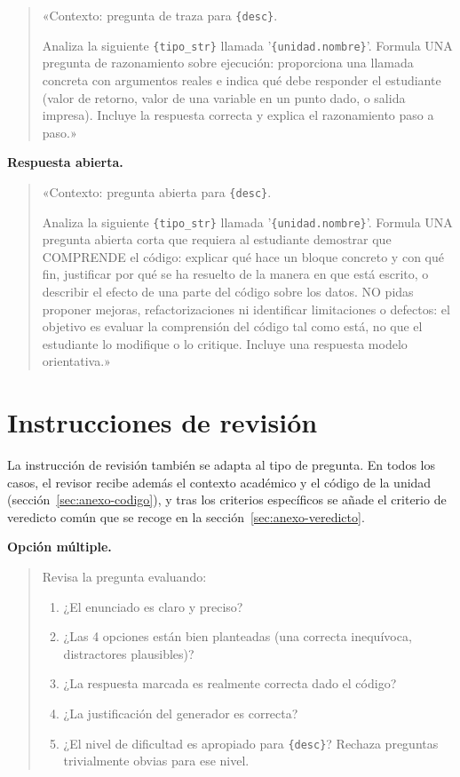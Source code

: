 \begin{quote}\small
«Contexto: pregunta de traza para \texttt{\{desc\}}.

Analiza la siguiente \texttt{\{tipo\_str\}} llamada '\texttt{\{unidad.nombre\}}'.
Formula UNA pregunta de razonamiento sobre ejecución: proporciona una llamada
concreta con argumentos reales e indica qué debe responder el estudiante (valor
de retorno, valor de una variable en un punto dado, o salida impresa). Incluye
la respuesta correcta y explica el razonamiento paso a paso.»
\end{quote}

\textbf{Respuesta abierta.}

\begin{quote}\small
«Contexto: pregunta abierta para \texttt{\{desc\}}.

Analiza la siguiente \texttt{\{tipo\_str\}} llamada '\texttt{\{unidad.nombre\}}'.
Formula UNA pregunta abierta corta que requiera al estudiante demostrar que
COMPRENDE el código: explicar qué hace un bloque concreto y con qué fin,
justificar por qué se ha resuelto de la manera en que está escrito, o describir
el efecto de una parte del código sobre los datos. NO pidas proponer mejoras,
refactorizaciones ni identificar limitaciones o defectos: el objetivo es evaluar
la comprensión del código tal como está, no que el estudiante lo modifique o lo
critique. Incluye una respuesta modelo orientativa.»
\end{quote}


\section{Instrucciones de revisión}
\label{sec:anexo-revision}

La instrucción de revisión también se adapta al tipo de pregunta. En todos los
casos, el revisor recibe además el contexto académico y el código de la unidad
(sección~\ref{sec:anexo-codigo}), y tras los criterios específicos se añade el
criterio de veredicto común que se recoge en la sección~\ref{sec:anexo-veredicto}.

\textbf{Opción múltiple.}

\begin{quote}\small
Revisa la pregunta evaluando:
\begin{enumerate}
  \item ¿El enunciado es claro y preciso?
  \item ¿Las 4 opciones están bien planteadas (una correcta inequívoca,
        distractores plausibles)?
  \item ¿La respuesta marcada es realmente correcta dado el código?
  \item ¿La justificación del generador es correcta?
  \item ¿El nivel de dificultad es apropiado para \texttt{\{desc\}}? Rechaza
        preguntas trivialmente obvias para ese nivel.
\end{enumerate}
\end{quote}

